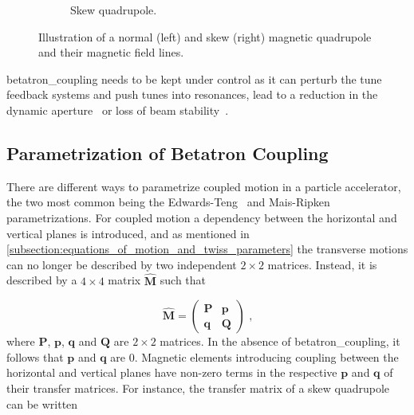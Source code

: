\begin{figure}[!hbt]
\begin{subfigure}[b]{0.49\textwidth}
        \caption{Skew quadrupole.}
        \label{subfigure:skew_quadrupole}
    \end{subfigure}
    \caption{Illustration of a \gls{normal} (left) and \gls{skew} (right) magnetic quadrupole and their magnetic field lines.}
    \label{figure:normal_vs_skew_quadrupole}
\end{figure}

\Gls{betatron_coupling} needs to be kept under control as it can perturb the tune feedback systems and push tunes into resonances, lead to a reduction in the dynamic aperture~\cite{PA:Ripken:Impact_Linear_Coupling_Nonlinear_Dynamics} or loss of beam stability~\cite{MASTERS:Soubelet:Optics_Octupole_PyHEADTAIL,PRAB:Carver:Transverse_Instabilities_With_Coupling}.

\subsection{Parametrization of Betatron Coupling}
\label{subsection:parametrization_of_betatron_coupling}

There are different ways to parametrize coupled motion in a particle accelerator, the two most common being the Edwards-Teng~\cite{IEEE:Edwards:Parametrization_Linear_Coupled_Motion} and Mais-Ripken~\cite{AIP:Willeke:Methods_Beam_Optics} parametrizations.
For coupled motion a dependency between the horizontal and vertical planes is introduced, and as mentioned in \cref{subsection:equations_of_motion_and_twiss_parameters} the transverse motions can no longer be described by two independent \(2 \times 2\) matrices.
Instead, it is described by a \(4 \times 4\) matrix \(\hat{\mathbf{M}}\) such that

\begin{equation}
    \hat{\mathbf{M}} = \begin{pmatrix}
        \mathbf{P} & \mathbf{p} \\
        \mathbf{q} & \mathbf{Q}
    \end{pmatrix} \text{ ,}
    \label{equation:coupled_motion_matrix}
\end{equation}
where \(\mathbf{P}\), \(\mathbf{p}\), \(\mathbf{q}\) and \(\mathbf{Q}\) are \(2 \times 2\) matrices.
In the absence of \gls{betatron_coupling}, it follows that \(\mathbf{p}\) and \(\mathbf{q}\) are \num{0}.
Magnetic elements introducing coupling between the horizontal and vertical planes have non-zero terms in the respective \(\mathbf{p}\) and \(\mathbf{q}\) of their transfer matrices.
For instance, the transfer matrix of a \gls{skew} quadrupole can be written

